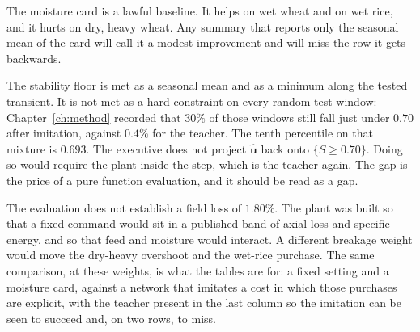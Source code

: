 The moisture card is a lawful baseline. It helps on wet wheat and on wet rice, and it hurts on dry, heavy wheat. Any summary that reports only the seasonal mean of the card will call it a modest improvement and will miss the row it gets backwards.

The stability floor is met as a seasonal mean and as a minimum along the tested transient. It is not met as a hard constraint on every random test window: Chapter~\ref{ch:method} recorded that \(30\%\) of those windows still fall just under \(0.70\) after imitation, against \(0.4\%\) for the teacher. The tenth percentile on that mixture is \(0.693\). The executive does not project \(\hat{\mathbf{u}}\) back onto \(\{S\ge 0.70\}\). Doing so would require the plant inside the step, which is the teacher again. The gap is the price of a pure function evaluation, and it should be read as a gap.

The evaluation does not establish a field loss of \(1.80\%\). The plant was built so that a fixed command would sit in a published band of axial loss and specific energy, and so that feed and moisture would interact. A different breakage weight would move the dry-heavy overshoot and the wet-rice purchase. The same comparison, at these weights, is what the tables are for: a fixed setting and a moisture card, against a network that imitates a cost in which those purchases are explicit, with the teacher present in the last column so the imitation can be seen to succeed and, on two rows, to miss.
